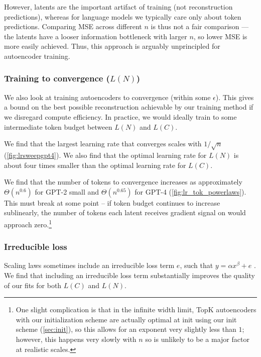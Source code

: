 However, latents are the important artifact of training (not reconstruction predictions), whereas for language models we typically care only about token predictions.  Comparing MSE across different $n$ is thus not a fair comparison --- the latents have a looser information bottleneck with larger $n$, so lower MSE is more easily achieved.  Thus, this approach is arguably unprincipled for autoencoder training. %



\subsubsection{Training to convergence (\texorpdfstring{$L(N)$}{L(N)})}

We also look at training autoencoders to convergence (within some $\epsilon$). This gives a bound on the best possible reconstruction achievable by our training method if we disregard compute efficiency. In practice, we would ideally train to some intermediate token budget between $L(N)$ and $L(C)$.

We find that the largest learning rate that converges scales with $1/\sqrt{n}$ (\autoref{fig:lrsweepgpt4}). We also find that the optimal learning rate for $L(N)$ is about four times smaller than the optimal learning rate for $L(C)$.

We find that the number of tokens to convergence increases as approximately $\Theta(n^{0.6})$ for GPT-2 small and $\Theta(n^{0.65})$ for GPT-4 (\autoref{fig:lr_tok_powerlaws}). This must break at some point -- if token budget continues to increase sublinearly, the number of tokens each latent receives gradient signal on would approach zero.\footnote{One slight complication is that in the infinite width limit, TopK autoencoders with our initialization scheme are actually optimal at init using our init scheme (\autoref{sec:init}), so this allows for an exponent very slightly less than $1$; however, this happens very slowly with $n$ so is unlikely to be a major factor at realistic scales.}

\subsubsection{Irreducible loss}
\label{sec:irred-loss}

Scaling laws sometimes include an irreducible loss term $e$, such that $y = \alpha x^\beta + e$ \citep{henighan2020scaling}. We find that including an irreducible loss term substantially improves the quality of our fits for both $L(C)$ and $L(N)$.

